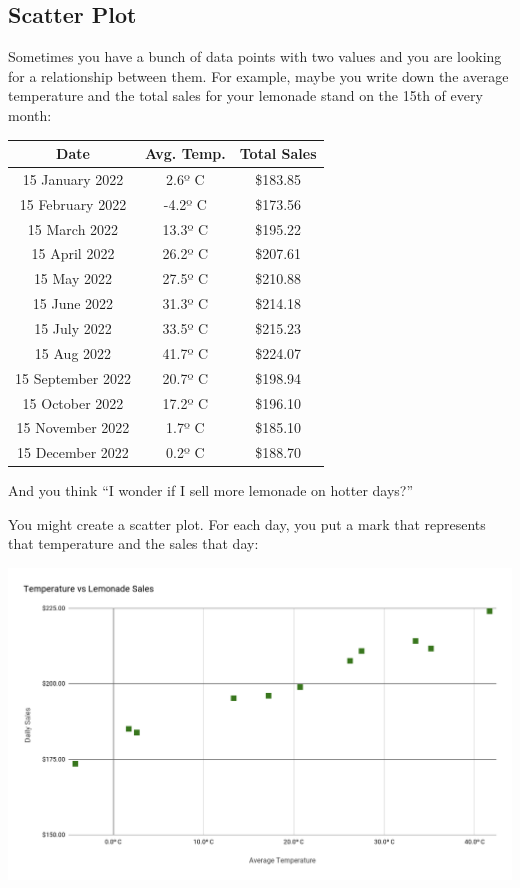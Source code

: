 \subsection{Scatter Plot}

Sometimes you have a bunch of data points with two values and you are
looking for a relationship between them.  For example, maybe you write
down the average temperature and the total sales for your lemonade
stand on the 15th of every month:

\begin{tabular}{c | c | c}
  Date &	Avg. Temp. &	Total Sales \\
  \hline
15 January 2022 & 2.6º C & \$183.85 \\
15 February 2022 & -4.2º C & \$173.56\\
15 March 2022 & 13.3º C & \$195.22\\
15 April 2022 & 26.2º C & \$207.61\\
15 May 2022 & 27.5º C & \$210.88\\
15 June 2022 & 31.3º C & \$214.18\\
15 July 2022 & 33.5º C & \$215.23\\
15 Aug 2022 & 41.7º C & \$224.07\\
15 September 2022 & 20.7º C & \$198.94\\
15 October 2022 & 17.2º C & \$196.10\\
15 November 2022 & 1.7º C & \$185.10\\
15 December 2022 & 0.2º C & \$188.70 \\
\end{tabular}

And you think ``I wonder if I sell more lemonade on hotter days?''

You might create a scatter plot.  For each day, you put a mark that
represents that temperature and the sales that day:

\includegraphics[width=\textwidth]{LemonadeScatter.png}


